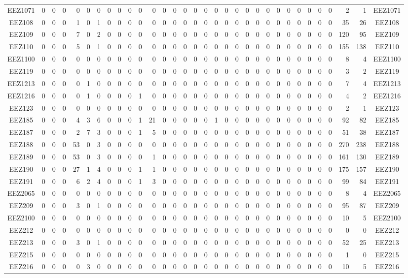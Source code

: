 \documentclass[10pt,a4paper,twoside]{report}
\begin{document}
{\begin{tabular}{crrrrrrrrrrrrrrrrrrrrrrrrrrrrrrc}
EEZ1071&0&0&0&0&0&0&0&0&0&0&0&0&0&0&0&0&0&0&0&0&0&0&0&0&0&0&0&0&2&1&EEZ1071\\
EEZ108&0&0&0&1&0&1&0&0&0&0&0&0&0&0&0&0&0&0&0&0&0&0&0&0&0&0&0&0&35&26&EEZ108\\
EEZ109&0&0&0&7&0&2&0&0&0&0&0&0&0&0&0&0&0&0&0&0&0&0&0&0&0&0&0&0&120&95&EEZ109\\
EEZ110&0&0&0&5&0&1&0&0&0&0&0&0&0&0&0&0&0&0&0&0&0&0&0&0&0&0&0&0&155&138&EEZ110\\
EEZ1100&0&0&0&0&0&0&0&0&0&0&0&0&0&0&0&0&0&0&0&0&0&0&0&0&0&0&0&0&8&4&EEZ1100\\
EEZ119&0&0&0&0&0&0&0&0&0&0&0&0&0&0&0&0&0&0&0&0&0&0&0&0&0&0&0&0&3&2&EEZ119\\
EEZ1213&0&0&0&0&1&0&0&0&0&0&0&0&0&0&0&0&0&0&0&0&0&0&0&0&0&0&0&0&7&4&EEZ1213\\
EEZ1216&0&0&0&0&1&0&0&0&0&1&0&0&0&0&0&0&0&0&0&0&0&0&0&0&0&0&0&0&4&2&EEZ1216\\
EEZ123&0&0&0&0&0&0&0&0&0&0&0&0&0&0&0&0&0&0&0&0&0&0&0&0&0&0&0&0&2&1&EEZ123\\
EEZ185&0&0&0&4&3&6&0&0&0&1&21&0&0&0&0&0&1&0&0&0&0&0&0&0&0&0&0&0&92&82&EEZ185\\
EEZ187&0&0&0&2&7&3&0&0&0&1&5&0&0&0&0&0&0&0&0&0&0&0&0&0&0&0&0&0&51&38&EEZ187\\
EEZ188&0&0&0&53&0&3&0&0&0&0&0&0&0&0&0&0&0&0&0&0&0&0&0&0&0&0&0&0&270&238&EEZ188\\
EEZ189&0&0&0&53&0&3&0&0&0&0&1&0&0&0&0&0&0&0&0&0&0&0&0&0&0&0&0&0&161&130&EEZ189\\
EEZ190&0&0&0&27&1&4&0&0&0&1&1&0&0&0&0&0&0&0&0&0&0&0&0&0&0&0&0&0&175&157&EEZ190\\
EEZ191&0&0&0&6&2&4&0&0&0&1&3&0&0&0&0&0&0&0&0&0&0&0&0&0&0&0&0&0&99&84&EEZ191\\
EEZ2065&0&0&0&0&0&0&0&0&0&0&0&0&0&0&0&0&0&0&0&0&0&0&0&0&0&0&0&0&8&4&EEZ2065\\
EEZ209&0&0&0&3&0&1&0&0&0&0&0&0&0&0&0&0&0&0&0&0&0&0&0&0&0&0&0&0&95&87&EEZ209\\
EEZ2100&0&0&0&0&0&0&0&0&0&0&0&0&0&0&0&0&0&0&0&0&0&0&0&0&0&0&0&0&10&5&EEZ2100\\
EEZ212&0&0&0&0&0&0&0&0&0&0&0&0&0&0&0&0&0&0&0&0&0&0&0&0&0&0&0&0&0&0&EEZ212\\
EEZ213&0&0&0&3&0&1&0&0&0&0&0&0&0&0&0&0&0&0&0&0&0&0&0&0&0&0&0&0&52&25&EEZ213\\
EEZ215&0&0&0&0&0&0&0&0&0&0&0&0&0&0&0&0&0&0&0&0&0&0&0&0&0&0&0&0&1&0&EEZ215\\
EEZ216&0&0&0&0&3&0&0&0&0&0&0&0&0&0&0&0&0&0&0&0&0&0&0&0&0&0&0&0&10&5&EEZ216\\

\end{tabular}}
\end{document}
